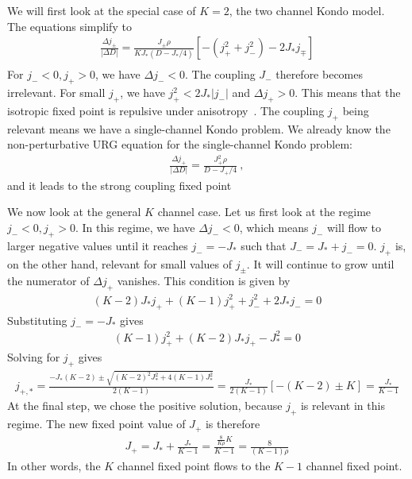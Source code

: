 \documentclass[12pt]{revtex4-2}
\begin{document}
We will first look at the special case of \(K=2\), the two channel Kondo model. The equations simplify to
\begin{align}
	\frac{\Delta j_\pm}{|\Delta D|} = \frac{J_\pm \rho}{K J_*\left(D - J_*/4\right)}\left[- \left(j_+^2 + j_-^2\right) - 2J_* j_\mp\right]\\
\end{align}
For \(j_- < 0, j_+ > 0\), we have \(\Delta j_- < 0\). The coupling \(J_-\) therefore becomes irrelevant. For small \(j_+\), we have \(j_+^2 < 2J_* |j_-|\)  and \(\Delta j_+ > 0\). This means that the isotropic fixed point is repulsive under anisotropy~\cite{Noz_blandin_1980}. The coupling \(j_+\) being relevant means we have a single-channel Kondo problem. We already know the non-perturbative URG equation for the single-channel Kondo problem:
\begin{align}
	\frac{\Delta j_+}{|\Delta D|} = \frac{J_+^2 \rho}{D - J_+/4}~,
\end{align}
and it leads to the strong coupling fixed point

We now look at the general \(K\) channel case. Let us first look at the regime \(j_- < 0, j_+ > 0\). In this regime, we have \(\Delta j_- < 0\), which means \(j_-\) will flow to larger negative values until it reaches \(j_- = -J_*\) such that \(J_- = J_* + j_- = 0\). \(j_+\) is, on the other hand, relevant for small values of \(j_\pm\). It will continue to grow until the numerator of \(\Delta j_+\) vanishes. This condition is given by
\begin{align}
	\left(K - 2\right)J_*j_+ + (K-1)j_+^2 + j_-^2 + 2J_* j_- = 0
\end{align}
Substituting \(j_- = -J_*\) gives
\begin{align}
	(K-1)j_+^2 + \left(K - 2\right)J_*j_+ - J_*^2 = 0
\end{align}
Solving for \(j_+\) gives
\begin{align}
	j_{+,*} = \frac{-J_*(K-2) \pm \sqrt{(K-2)^2 J_*^2 + 4(K-1)J_*^2}}{2(K-1)} = \frac{J_*}{2(K-1)}\left[-(K-2) \pm K\right] = \frac{J_*}{K-1}
\end{align}
At the final step, we chose the positive solution, because \(j_+\) is relevant in this regime. The new fixed point value of \(J_+\) is therefore
\begin{align}
	J_+ = J_* + \frac{J_*}{K-1} = \frac{\frac{8}{K \rho} K}{K - 1} = \frac{8}{(K-1)\rho}
\end{align}
In other words, the \(K\) channel fixed point flows to the \(K-1\) channel fixed point.
\end{document}
